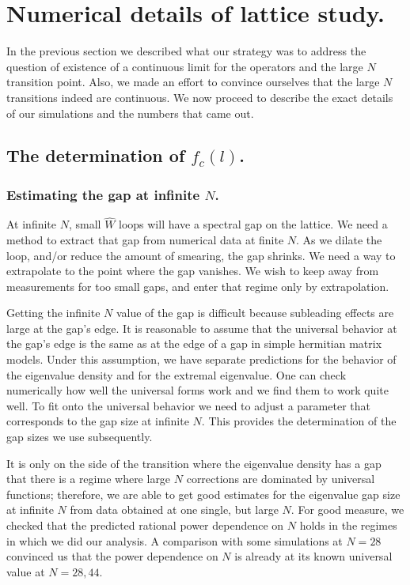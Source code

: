 \section{Numerical details of lattice study.}

In the previous section we described what our strategy was to
address the question of existence of a continuous limit for the
operators and the large $N$ transition point. Also, we made an
effort to convince ourselves that the large $N$ transitions indeed
are continuous. We now proceed to describe the exact details of
our simulations and the numbers that came out.

\subsection{The determination of $f_c(l)$.}

\subsubsection{Estimating the  gap at infinite $N$.}

At infinite $N$, small $\hat W$ loops will have a spectral gap on
the lattice. We need a method to extract that gap from numerical
data at finite $N$. As we dilate the loop, and/or reduce the
amount of smearing, the gap shrinks. We need a way to extrapolate
to the point where the gap vanishes. We wish to keep away from
measurements for too small gaps, and enter that regime only by
extrapolation.

Getting the infinite $N$ value of the gap is difficult because
subleading effects are large at the gap's edge. It is reasonable
to assume that the universal behavior at the gap's edge is the
same as at the edge of a gap in simple hermitian matrix models.
Under this assumption, we have separate predictions for the
behavior of the eigenvalue density and for the extremal
eigenvalue. One can check numerically how well the universal forms
work and we find them to work quite well. To fit onto the
universal behavior we need to adjust a parameter that corresponds
to the gap size at infinite $N$. This provides the determination
of the gap sizes we use subsequently.

It is only on the side of the transition where the eigenvalue density
has a gap that
there is a regime where large $N$ corrections are dominated by
universal functions; therefore, we are able to get good estimates
for the eigenvalue gap size at infinite $N$ from data obtained at one single,
but large $N$. For good measure, we checked that the predicted rational
power dependence on $N$ holds in the regimes in which we did our
analysis. A comparison with some simulations at $N=28$ convinced
us that the power dependence on $N$ is already at its known
universal value at
$N=28,44$.


